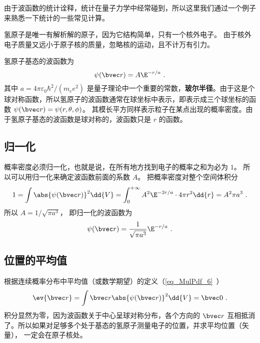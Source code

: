 

由于波函数的统计诠释，统计在量子力学中经常碰到，所以这里我们通过一个例子来熟悉一下统计的一些常见计算。

氢原子是唯一有解析解的原子，因为它结构简单，只有一个核外电子。 由于核外电子质量又远小于原子核的质量，忽略核的运动，且不计万有引力。

氢原子基态的波函数为
\begin{equation}
\psi(\bvec r) = A\E^{-r/a}~.
\end{equation}
其中 $a = 4\pi\varepsilon_0 \hbar ^2/(m_e e^2)$ 是量子理论中一个重要的常数，\textbf{玻尔半径}。由于这是个球对称函数，所以氢原子的波函数通常在球坐标中表示，即表示成三个球坐标的函数 $\psi (\bvec r) = \psi (r, \theta, \phi)$。 其模长平方同样表示粒子在某点出现的概率密度。由于氢原子基态的波函数是球对称的，波函数只是 $r$ 的函数。

\subsection{归一化}
  
概率密度必须归一化，也就是说，在所有地方找到电子的概率之和为必为 $1$。 所以可以用归一化来确定波函数前面的系数 $A$。 把概率密度对整个空间体积分
\begin{equation}
1 = \int \abs{\psi(\bvec r)} ^2 \dd{V}  = \int_0^{+\infty} A^2 \E^{-2r/a} \cdot 4\pi r^2\dd{r} = A^2 \pi a^3~.
\end{equation}
所以 $A = 1/\sqrt{\pi a^3}$， 即归一化的波函数为
\begin{equation}
\psi (\bvec r) = \frac{1}{\sqrt{\pi a^3}} \E^{-r/a}~.
\end{equation}

\subsection{位置的平均值}

 根据连续概率分布中平均值（或数学期望）的定义（\autoref{eq_MulPdf_6}~）
\begin{equation}
\ev{\bvec r} = \int \bvec r \abs{\psi (\bvec r)} ^2 \dd{V} =  \bvec 0~.
\end{equation}
积分显然为零，因为波函数关于中心呈球对称分布，各个方向的 $\bvec r$ 互相抵消了。所以如果对足够多个处于基态的氢原子测量电子的位置，并求平均位置（矢量）， 一定会在原子核处。


